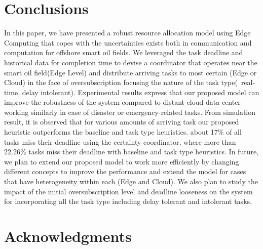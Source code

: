 \section{Conclusions}\label{conclusion}
In this paper, we have presented a robust resource allocation model using Edge Computing that copes with the uncertainties exists both in communication and computation for offshore smart oil fields. We leveraged the task deadline and historical data for completion time to devise a coordinator that operates near the smart oil field(Edge Level) and distribute arriving tasks to most certain \pu(Edge or Cloud) in the face of oversubscription focusing the nature of the task type(\eg~real-time, delay intolerant). Experimental results express that our proposed model can improve the robustness of the system compared to distant cloud data center working similarly in case of disaster or emergency-related tasks. From simulation result, it is observed that for various amounts of arriving task our proposed heuristic outperforms the baseline and task type heuristics. about 17\% of all tasks miss their deadline using the certainty coordinator, where more than 22.26\% tasks miss their deadline with baseline and task type heuristics. In future, we plan to extend our proposed model to work more efficiently by changing different concepts to improve the performance and extend the model for cases that have heterogeneity within each \pu(Edge and Cloud). We also plan to study the impact of the initial oversubscription level and deadline looseness on the system for incorporating all the task type including delay tolerant and intolerant tasks.

\section*{Acknowledgments}

 